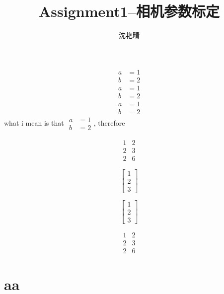 \documentclass[10pt,a4paper]{article}
\author{沈艳晴}
\title{Assignment1--相机参数标定}
\begin{document}
\begin{CJK*}{UTF8}{gbsn}
\CJKindent%
\maketitle

\begin{align}
a&=1 \\
b&=2
\end{align}
$$
\begin{aligned}
a&=1 \\
b&=2
\end{aligned}
$$
\begin{equation}
\begin{aligned}
a&=1 \\
b&=2
\end{aligned}
\end{equation}
what i mean is that $
\begin{aligned}
a&=1 \\
b&=2
\end{aligned}
$, therefore

$$
\begin{array}{cc}
1 & 2\\2&3 \\2&6
\end{array}
$$

$$
\left[
\begin{array}{c}
1 \\ 2 \\ 3
\end{array}\right]
$$

$$
\begin{bmatrix}
1 \\ 2 \\ 3
\end{bmatrix}
$$

\[
\begin{matrix}
1 & 2\\2&3 \\2&6
\end{matrix}
\]


\section{aa} \label{aa}





\end{CJK*}
\end{document}
